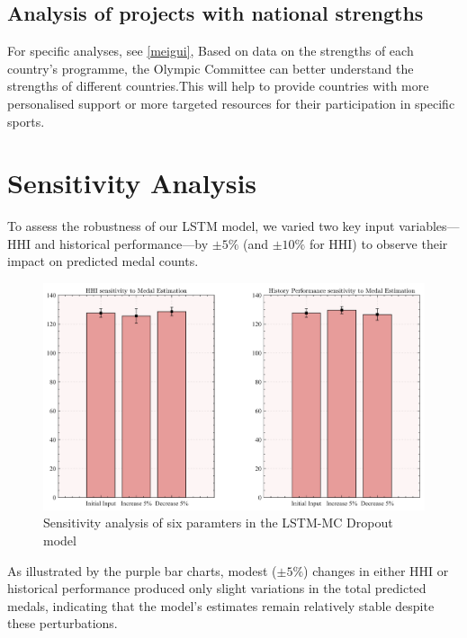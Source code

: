 \documentclass{mcmthesis}
\begin{document}
\subsection{Analysis of projects with national strengths}
For specific analyses, see \ref{meigui}, Based on data on the strengths of each country's programme, the Olympic Committee can better understand the strengths of different countries.This will help to provide countries with more personalised support or more targeted resources for their participation in specific sports.
%	
\section{Sensitivity Analysis}
To assess the robustness of our LSTM model, we varied two key input variables—HHI and historical performance—by $\pm5\%$ (and $\pm10\%$ for HHI) to observe their impact on predicted medal counts. 

	\begin{figure}[H]
	\centering
	\includegraphics[width=0.8\linewidth]{fig/barplot.png}
	\caption{Sensitivity analysis of six paramters in the LSTM-MC Dropout model}
	\label{barplot}
	\end{figure}
As illustrated by the purple bar charts, modest ($\pm5\%$) changes in either HHI or historical performance produced only slight variations in the total predicted medals, indicating that the model’s estimates remain relatively stable despite these perturbations. 
\end{document}
